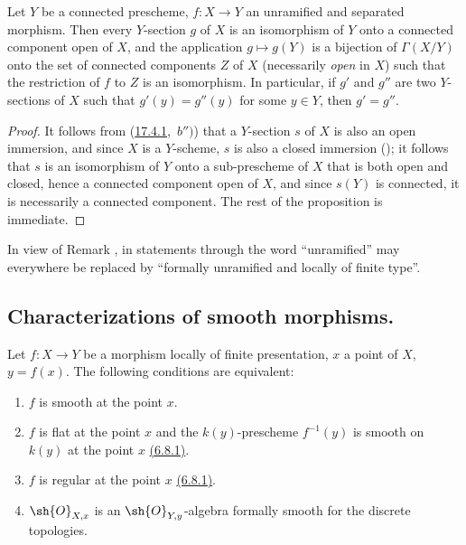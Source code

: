 \begin{proposition}[17.4.9]
\label{IV.17.4.9}
Let $Y$ be a connected prescheme, $f:X\to Y$ an unramified and separated morphism.
Then every $Y$-section $g$ of $X$ is an isomorphism of $Y$ onto a connected component open of $X$, and the application $g\mapsto g(Y)$ is a bijection of $\Gamma(X/Y)$ onto the set of connected components $Z$ of $X$ (necessarily \emph{open} in $X$) such that the restriction of $f$ to $Z$ is an isomorphism.
In particular, if $g'$ and $g''$ are two $Y$-sections of $X$ such that $g'(y)=g''(y)$ for some $y\in Y$, then $g'=g''$.
\end{proposition}

\begin{proof}
It follows from ({\hyperlink{ega4.c04.thm.17-4-1}{17.4.1}},~$b'')$) that a $Y$-section $s$ of $X$ is also an open immersion, and since $X$ is a $Y$-scheme, $s$ is also a closed immersion (); it follows that $s$ is an isomorphism of $Y$ onto a sub-prescheme of $X$ that is both open and closed, hence a connected component open of $X$, and since $s(Y)$ is connected, it is necessarily a connected component.
The rest of the proposition is immediate.
\end{proof}

\begin{remark}[17.4.10]
\label{IV.17.4.10}
In view of Remark , in statements  through  the word ``unramified'' may everywhere be replaced by ``formally unramified and locally of finite type''.
\end{remark}

\subsection{Characterizations of smooth morphisms.}
\label{subsection:IV.17.5}


\begin{theorem}[17.5.1]
\label{IV.17.5.1}
Let $f:X\to Y$ be a morphism locally of finite presentation, $x$ a point of $X$, $y=f(x)$.
The following conditions are equivalent:
\begin{enumerate}[label=(\alph*)]
  \item $f$ is smooth at the point $x$.
  \item $f$ is flat at the point $x$ and the $k(y)$-prescheme $f^{-1}(y)$ is smooth on $k(y)$ at the point $x$ {\hyperlink{ega4.c04.def.6-8-1}{(6.8.1)}}.
  \item[b')] $f$ is regular at the point $x$ {\hyperlink{ega4.c04.def.6-8-1}{(6.8.1)}}.
  \item $\sh{O}_{X,x}$ is an $\sh{O}_{Y,y}$-algebra formally smooth for the discrete topologies.
\end{enumerate}
\end{theorem}

